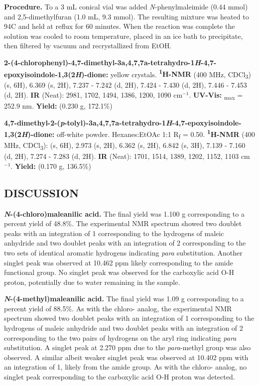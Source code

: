 \documentclass[11pt]{article}
\let\bf\textbf
\begin{document}
\bf{Procedure.} To a 3 mL conical vial was added \textit{N}-phenylmaleimide (0.44 mmol) and 2,5-dimethylfuran (1.0 mL, 9.3 mmol). The resulting mixture was heated to 94\degree C and held at reflux for 60 minutes. When the reaction was complete the solution was cooled to room temperature, placed in an ice bath to precipitate, then filtered by vacuum and recrystallized from EtOH. 

\newpage
\bf{2-(4-chlorophenyl)-4,7-dimethyl-3a,4,7,7a-tetrahydro-1\textit{H}-4,7-epoxyisoindole-1,3(2\textit{H})-dione:} yellow crystals. \bf{\textsuperscript{1}H-NMR} (400 MHz, CDCl\textsubscript{3}) \textdelta{} (s, 6H), 6.369 (s, 2H), 7.237 - 7.242 (d, 2H), 7.424 - 7.430 (d, 2H), 7.446 - 7.453 (d, 2H). \bf{IR} (Neat): 2981, 1702, 1494, 1386, 1200, 1090 cm$^{-1}$. \bf{UV-Vis:} \textlambda\textsubscript{max} = 252.9 nm. \bf{Yield:} (0.230 g, 172.1\%)

\bf{4,7-dimethyl-2-(\textit{p}-tolyl)-3a,4,7,7a-tetrahydro-1\textit{H}-4,7-epoxyisoindole-1,3(2\textit{H})-dione:} off-white powder. Hexanes:EtOAc 1:1 R\textsubscript{f} = 0.50. \bf{\textsuperscript{1}H-NMR} (400 MHz, CDCl\textsubscript{3}): \textdelta{} (s, 6H), 2.973 (s, 2H), 6.362 (s, 2H), 6.842 (s, 3H), 7.139 - 7.160 (d, 2H), 7.274 - 7.283 (d, 2H). \bf{IR} (Neat): 1701, 1514, 1389, 1202, 1152, 1103 cm$^{-1}$. \bf{Yield:} (0.170 g, 136.5\%)

\subsection*{DISCUSSION}
\bf{\textit{N}-(4-chloro)maleanilic acid.} The final yield was 1.100 g corresponding to a percent yield of 48.8\%. The experimental NMR spectrum showed two doublet peaks with an integration of 1 corresponding to the hydrogens of maleic anhydride and two doublet peaks with an integration of 2 corresponding to the two sets of identical aromatic hydrogens indicating \textit{para} substitution. Another singlet peak was observed at 10.462 ppm likely corresponding to the amide functional group. No singlet peak was observed for the carboxylic acid O-H proton, potentially due to water remaining in the sample.

\bf{\textit{N}-(4-methyl)maleanilic acid.} The final yield was 1.09 g corresponding to a percent yield of 88.5\%. As with the chloro- analog, the experimental NMR spectrum showed two doublet peaks with an integration of 1 corresponding to the hydrogens of maleic anhydride and two doublet peaks with an integration of 2 corresponding to the two pairs of hydrogens on the aryl ring indicating \textit{para} substitution. A singlet peak at 2.270 ppm due to the \textit{para}-methyl group was also observed. A similar albeit weaker singlet peak was observed at 10.402 ppm with an integration of 1, likely from the amide group. As with the chloro- analog, no singlet peak corresponding to the carboxylic acid O-H proton was detected. 
\end{document}
